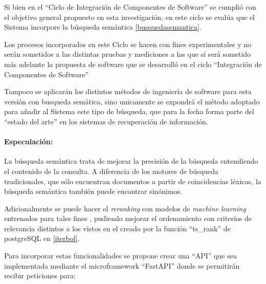 \documentclass[
  12pt,
  openany]{book}
\begin{document}
Si bien en el ``Ciclo de Integración de Componentes de Software'' se cumplió con el objetivo general propuesto en esta investigación, en este ciclo se evalúa que el Sistema incorpore la búsqueda semántica \ref{busquedasemantica}.

Los procesos incorporados en este Ciclo se hacen con fines experimentales y no serán sometidos a las distintas pruebas y mediciones a las que sí será sometido más adelante la propuesta de software que se desarrolló en el ciclo ``Integración de Componentes de Software''

Tampoco se aplicarán los distintos métodos de ingeniería de software para esta versión con busqueda semática, sino unicamente se expondrá el método adoptado para añadir al Sistema este tipo de búsqueda, que para la fecha forma parte del ``estado del arte'' en los sistemas de recuperación de información.

\hypertarget{semanespe}{%
\paragraph{Especulación:}\label{semanespe}}

La búsqueda semántica trata de mejorar la precisión de la búsqueda entendiendo el contenido de la consulta. A diferencia de los motores de búsqueda tradicionales, que sólo encuentran documentos a partir de coincidencias léxicas, la búsqueda semántica también puede encontrar sinónimos.

Adicionalmente se puede hacer el \emph{reranking} con modelos de \emph{machine learning} entrenados para tales fines \citep{gökçe2020}, \citep{nogueira2019} pudiendo mejorar el ordenamiento con criterios de relevancia distintos a los vistos en el creado por la función ``ts\_rank'' de postgreSQL en \ref{iterbol}.

Para incorporar estas funcionalidades se propone crear una ``API'' que sea implementada mediante el microframework ``FastAPI'' donde se permitirán recibir peticiones para:
\end{document}
